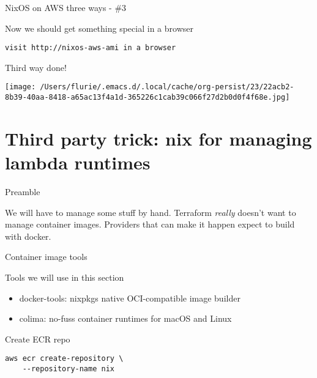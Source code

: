 \documentclass[bigger]{beamer}
\begin{document}
\begin{frame}[label={sec:org881f6ac},fragile]{NixOS on AWS three ways - \#3}
 \begin{exampleblock}{Now we should get something special in a browser}
\begin{verbatim}
visit http://nixos-aws-ami in a browser
\end{verbatim}

Third way done!
\begin{center}
\texttt{[image: /Users/flurie/.emacs.d/.local/cache/org-persist/23/22acb2-8b39-40aa-8418-a65ac13f4a1d-365226c1cab39c066f27d2b0d0f4f68e.jpg]}
\end{center}
\end{exampleblock}
\end{frame}
\section{Third party trick: nix for managing lambda runtimes}
\label{sec:org3217961}
\begin{frame}[label={sec:orgf967a50}]{Preamble}
\begin{alertblock}{We will have to manage some stuff by hand.}
Terraform \emph{really} doesn't want to manage container images.
Providers that can make it happen expect to build with docker.
\end{alertblock}
\end{frame}
\begin{frame}[label={sec:orge3f10fb},fragile]{Container image tools}
 \begin{alertblock}{Tools we will use in this section}
\begin{itemize}
\item docker-tools: nixpkgs native OCI-compatible image builder
\item colima: no-fuss container runtimes for macOS and Linux
\end{itemize}
\end{alertblock}
\begin{exampleblock}{Create ECR repo}
\begin{verbatim}
aws ecr create-repository \
    --repository-name nix
\end{verbatim}
\end{exampleblock}
\end{frame}
\end{document}
